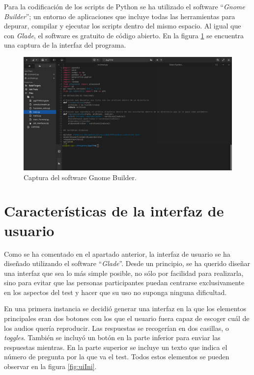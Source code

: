 \documentclass[11pt,a4paper,twoside]{book}
\begin{document}
           \newpage

           Para la codificación de los scripts de Python se ha utilizado el software ``\textit{Gnome Builder}''; un entorno de aplicaciones que incluye todas las herramientas para depurar, compilar y ejecutar los scripts dentro del mismo espacio. Al igual que con \textit{Glade}, el software es gratuito de código abierto. En la figura \ref{fig:builderIni} se encuentra una captura de la interfaz del programa.
           
            \begin{figure}
                \begin{center}
                    \includegraphics[scale=.2]{../imagenes/builderIni.png}
                    \caption{Captura del software Gnome Builder.}
                    \label{fig:builderIni}
                \end{center}
            \end{figure}
            
        \section{Características de la interfaz de usuario}
            Como se ha comentado en el apartado anterior, la interfaz de usuario se ha diseñado utilizando el software ``\textit{Glade}''. Desde un principio, se ha querido diseñar una interfaz que sea lo más simple posible, no sólo por facilidad para realizarla, sino para evitar que las personas participantes puedan centrarse exclusivamente en los aspectos del test y hacer que su uso no suponga ninguna dificultad.  
            
            En una primera instancia se decidió generar una interfaz en la que los elementos principales eran dos botones con los que el usuario fuera capaz de escoger cuál de los audios quería reproducir. Las respuestas se recogerían en dos casillas, o \textit{toggles}. También se incluyó un botón en la parte inferior para enviar las respuestas mientras. En la parte superior se incluye un texto que indica el número de pregunta por la que va el test. Todos estos elementos se pueden observar en la figura \ref{fig:uiIni}.
            
\end{document}
